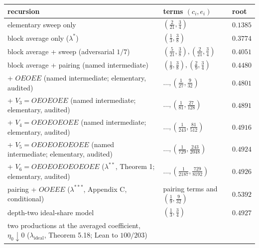 \documentclass[11pt,a4paper]{article}
\begin{document}
\begin{longtable}[]{@{}
  >{\raggedright\arraybackslash}p{}
  >{\raggedright\arraybackslash}p{}
  >{\raggedright\arraybackslash}p{}@{}}
\toprule\noalign{}
\begin{minipage}[b]{\linewidth}\raggedright
recursion
\end{minipage} & \begin{minipage}[b]{\linewidth}\raggedright
terms \((c_i,e_i)\)
\end{minipage} & \begin{minipage}[b]{\linewidth}\raggedright
root
\end{minipage} \\
\midrule\noalign{}
\endhead
\bottomrule\noalign{}
\endfoot
\bottomrule\noalign{}
\endlastfoot
elementary sweep only & \((\tfrac2{21},\tfrac34)\) & \(0.1385\) \\
block average only (\(\lambda^*\)) & \((\tfrac13,\tfrac38)\) &
\(0.3774\) \\
block average + sweep (adversarial \(1/7\)) &
\((\tfrac5{21},\tfrac38),(\tfrac2{21},\tfrac34)\) & \(0.4051\) \\
block average + pairing (named intermediate) &
\((\tfrac19,\tfrac38),(\tfrac29,\tfrac34)\) & \(0.4480\) \\
+ \(OEOEE\) (named intermediate; elementary, audited) &
\(\ldots,(\tfrac1{27},\tfrac9{32})\) & \(0.4801\) \\
+ \(V_3=OEOEOEE\) (named intermediate; elementary, audited) &
\(\ldots,(\tfrac1{81},\tfrac{27}{128})\) & \(0.4891\) \\
+ \(V_4=OEOEOEOEE\) (named intermediate; elementary, audited) &
\(\ldots,(\tfrac1{243},\tfrac{81}{512})\) & \(0.4916\) \\
+ \(V_5=OEOEOEOEOEE\) (named intermediate; elementary, audited) &
\(\ldots,(\tfrac1{729},\tfrac{243}{2048})\) & \(0.4924\) \\
+ \(V_6=OEOEOEOEOEOEE\) (\(\lambda^{**}\), Theorem 1; elementary,
audited) & \(\ldots,(\tfrac1{2187},\tfrac{729}{8192})\) & \(0.4926\) \\
pairing + \(OOEEE\) (\(\lambda^{***}\), Appendix C, conditional) &
pairing terms and \((\tfrac19,\tfrac9{32})\) & \(0.5392\) \\
depth-two ideal-share model & \((\tfrac13,\tfrac34)\) & \(0.4927\) \\
two productions at the averaged coefficient, \(\eta_0\downarrow0\)
(\(\lambda_{\mathrm{ideal}}\), Theorem 5.18; Lean to \(100/203\)) &

\end{longtable}
\end{document}
